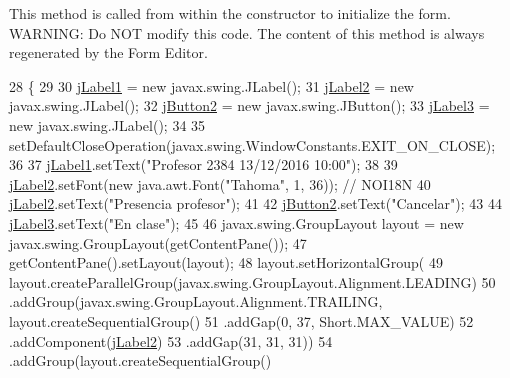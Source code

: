 This method is called from within the constructor to initialize the form. W\+A\+R\+N\+I\+NG\+: Do N\+OT modify this code. The content of this method is always regenerated by the Form Editor. 
\begin{DoxyCode}
28                                   \{
29 
30         \mbox{\hyperlink{classinterfacessoguar_1_1presenciaprof_ad2eecc0bf28ea2305d1008b07e796236}{jLabel1}} = \textcolor{keyword}{new} javax.swing.JLabel();
31         \mbox{\hyperlink{classinterfacessoguar_1_1presenciaprof_a48151227c574caee1cc79ec5af3ec825}{jLabel2}} = \textcolor{keyword}{new} javax.swing.JLabel();
32         \mbox{\hyperlink{classinterfacessoguar_1_1presenciaprof_a18f5bfde2ab11a4dc2cbf168d7d12cfd}{jButton2}} = \textcolor{keyword}{new} javax.swing.JButton();
33         \mbox{\hyperlink{classinterfacessoguar_1_1presenciaprof_a4f3e97efdda0f378c637202970533e22}{jLabel3}} = \textcolor{keyword}{new} javax.swing.JLabel();
34 
35         setDefaultCloseOperation(javax.swing.WindowConstants.EXIT\_ON\_CLOSE);
36 
37         \mbox{\hyperlink{classinterfacessoguar_1_1presenciaprof_ad2eecc0bf28ea2305d1008b07e796236}{jLabel1}}.setText(\textcolor{stringliteral}{"Profesor 2384 13/12/2016 10:00"});
38 
39         \mbox{\hyperlink{classinterfacessoguar_1_1presenciaprof_a48151227c574caee1cc79ec5af3ec825}{jLabel2}}.setFont(\textcolor{keyword}{new} java.awt.Font(\textcolor{stringliteral}{"Tahoma"}, 1, 36)); \textcolor{comment}{// NOI18N}
40         \mbox{\hyperlink{classinterfacessoguar_1_1presenciaprof_a48151227c574caee1cc79ec5af3ec825}{jLabel2}}.setText(\textcolor{stringliteral}{"Presencia profesor"});
41 
42         \mbox{\hyperlink{classinterfacessoguar_1_1presenciaprof_a18f5bfde2ab11a4dc2cbf168d7d12cfd}{jButton2}}.setText(\textcolor{stringliteral}{"Cancelar"});
43 
44         \mbox{\hyperlink{classinterfacessoguar_1_1presenciaprof_a4f3e97efdda0f378c637202970533e22}{jLabel3}}.setText(\textcolor{stringliteral}{"En clase"});
45 
46         javax.swing.GroupLayout layout = \textcolor{keyword}{new} javax.swing.GroupLayout(getContentPane());
47         getContentPane().setLayout(layout);
48         layout.setHorizontalGroup(
49             layout.createParallelGroup(javax.swing.GroupLayout.Alignment.LEADING)
50             .addGroup(javax.swing.GroupLayout.Alignment.TRAILING, layout.createSequentialGroup()
51                 .addGap(0, 37, Short.MAX\_VALUE)
52                 .addComponent(\mbox{\hyperlink{classinterfacessoguar_1_1presenciaprof_a48151227c574caee1cc79ec5af3ec825}{jLabel2}})
53                 .addGap(31, 31, 31))
54             .addGroup(layout.createSequentialGroup()

\end{DoxyCode}
